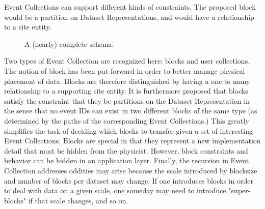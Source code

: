 \documentclass{cmspaper}
\begin{document}
Event Collections can support different kinds of constraints.  The proposed 
block would be a partition on Dataset Representations, and would have a 
relationship to a site entity.  
\begin{figure}[hbtp]
  \begin{center}
    \caption{A (nearly) complete schema.}
    \label{fig:detailed}
  \end{center}
\end{figure}
Two types of Event Collection are recognized here: blocks and user collections.  The 
notion of block has been put forward in order to better manage physical placement of data.  
Blocks are therefore distinguished by having a one to many relationship to a supporting site 
entity.  It is furthermore proposed that blocks satisfy the constraint that they be 
partitions on the Dataset Representation in the sense that no event IDs
can exist in two different blocks of the same type (as determined by the paths of the 
corresponding Event Collections.) This greatly simplifies the task of deciding which 
blocks to transfer given a set of interesting Event Collections.
Blocks are special in that they represent a new implementation detail 
that must be hidden from the physicist.  However, block constraints and behavior can be 
hidden in an application layer.  Finally, the recursion in Event Collection 
addresses oddities may arise 
because the scale introduced by blocksize and number of blocks per dataset may change.  
If one introduces blocks in order to deal with data on a given scale, one someday may need 
to introduce "super-blocks" if that scale changes, and so on. 
\end{document}
